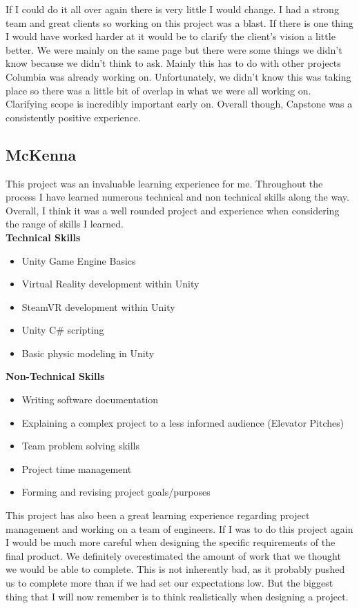 \documentclass[10pt,journal,compsoc,onecolumn, draftclsnofoot]{IEEEtran}
\begin{document}
\begin{itemize}
If I could do it all over again there is very little I would change. I had a strong team and great clients so working on this project was a blast. If there is one thing I would have worked harder at it would be to clarify the client’s vision a little better. We were mainly on the same page but there were some things we didn’t know because we didn’t think to ask. Mainly this has to do with other projects Columbia was already working on. Unfortunately, we didn’t know this was taking place so there was a little bit of overlap in what we were all working on. Clarifying scope is incredibly important early on. Overall though, Capstone was a consistently positive experience.


\subsection{McKenna}
This project was an invaluable learning experience for me. Throughout the process I have learned numerous technical and non technical skills along the way. Overall, I think it was a well rounded project and experience when considering the range of skills I learned. \\

\textbf{Technical Skills}
\begin{itemize}
	\item Unity Game Engine Basics
	\item Virtual Reality development within Unity
	\item SteamVR development within Unity
	\item Unity C\# scripting
	\item Basic physic modeling in Unity
\end{itemize}

\textbf{Non-Technical Skills}
\begin{itemize}
	\item Writing software documentation
	\item Explaining a complex project to a less informed audience (Elevator Pitches)
	\item Team problem solving skills
	\item Project time management
	\item Forming and revising project goals/purposes \\
\end{itemize}

This project has also been a great learning experience regarding project management and working on a team of engineers. If I was to do this project again I would be much more careful when designing the specific requirements of the final product. We definitely overestimated the amount of work that we thought we would be able to complete. This is not inherently bad, as it probably pushed us to complete more than if we had set our expectations low. But the biggest thing that I will now remember is to think realistically when designing a project.


\end{itemize}
\end{document}
